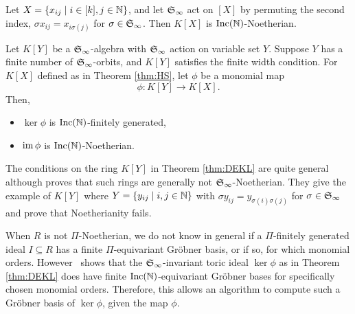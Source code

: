 \begin{theorem}\label{thm:HS}
 Let $X = \{x_{ij} \mid i \in [k], j \in \mathbb N\}$, and let $\mathfrak S_\infty$ act on $[X]$ by permuting the second index, $\sigma x_{ij} = x_{i\sigma(j)}$ for $\sigma \in \mathfrak S_\infty$.  Then $K[X]$ is $\operatorname{Inc}(\mathbb N)$-Noetherian.
\end{theorem}

\begin{theorem}\label{thm:DEKL}
 Let $K[Y]$ be a $\mathfrak S_\infty$-algebra with $\mathfrak S_\infty$ action on variable set $Y$.  Suppose $Y$ has a finite number of $\mathfrak S_\infty$-orbits, and $K[Y]$ satisfies the finite width condition.  For $K[X]$ defined as in Theorem \ref{thm:HS}, let $\phi$ be a monomial map
  \[ \phi: K[Y] \to K[X]. \]
 Then,
 \begin{itemize}
  \item $\ker \phi$ is $\operatorname{Inc}(\mathbb N)$-finitely generated,
  \item $\operatorname{im} \phi$ is $\operatorname{Inc}(\mathbb N)$-Noetherian.
 \end{itemize}
\end{theorem}

The conditions on the ring $K[Y]$ in Theorem \ref{thm:DEKL} are quite general although \cite{hillar2012finite} proves that such rings are generally not $\mathfrak S_\infty$-Noetherian.  They give the example of $K[Y]$ where $Y = \{y_{ij} \mid i, j \in \mathbb N\}$ with $\sigma y_{ij} = y_{\sigma(i)\sigma(j)}$ for $\sigma \in \mathfrak S_\infty$ and prove that Noetherianity fails.

When $R$ is not $\Pi$-Noetherian, we do not know in general if a $\Pi$-finitely generated ideal $I\subseteq R$ has a finite $\Pi$-equivariant Gr\"obner basis, or if so, for which monomial orders.  However~\cite{Krone:egb-toric} shows that the $\mathfrak S_\infty$-invariant toric ideal $\ker \phi$ as in Theorem \ref{thm:DEKL} does have finite $\operatorname{Inc}(\mathbb N)$-equivariant Gr\"obner bases for specifically chosen monomial orders.  Therefore, this allows an algorithm to compute such a Gr\"obner basis of $\ker \phi$, given the map $\phi$.
